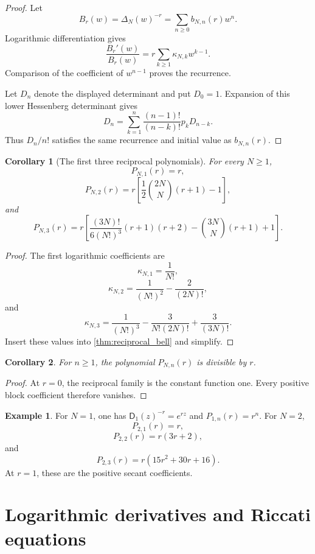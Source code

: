 \documentclass{aomart}
\newtheorem{corollary}[corollary]{Corollary}
\theoremstyle{definition}
\newtheorem{example}[example]{Example}
\theoremstyle{remark}
\newcommand{\Dfun}{\mathsf D}
\begin{document}
\begin{proof}
Let
\[
B_r(w)=\Delta_N(w)^{-r}
=
\sum_{n\geq0}b_{N,n}(r)w^n.
\]
Logarithmic differentiation gives
\[
\frac{B_r'(w)}{B_r(w)}
=
r\sum_{k\geq1}\kappa_{N,k}w^{k-1}.
\]
Comparison of the coefficient of $w^{n-1}$ proves the recurrence.

Let $D_n$ denote the displayed determinant and put $D_0=1$.  Expansion of this lower Hessenberg determinant gives
\[
D_n
=
\sum_{k=1}^{n}
\frac{(n-1)!}{(n-k)!}p_kD_{n-k}.
\]
Thus $D_n/n!$ satisfies the same recurrence and initial value as $b_{N,n}(r)$.
\end{proof}

\begin{corollary}[The first three reciprocal polynomials]\label{cor:first_reciprocal_polynomials}
For every $N\geq1$,
\[
P_{N,1}(r)=r,
\]
\[
P_{N,2}(r)
=
r\left[
\frac12\binom{2N}{N}(r+1)-1
\right],
\]
and
\[
P_{N,3}(r)
=
r\left[
\frac{(3N)!}{6(N!)^3}(r+1)(r+2)
-
\binom{3N}{N}(r+1)
+1
\right].
\]
\end{corollary}

\begin{proof}
The first logarithmic coefficients are
\[
\kappa_{N,1}=\frac1{N!},
\]
\[
\kappa_{N,2}=\frac1{(N!)^2}-\frac2{(2N)!},
\]
and
\[
\kappa_{N,3}
=
\frac1{(N!)^3}
-
\frac3{N!(2N)!}
+
\frac3{(3N)!}.
\]
Insert these values into \cref{thm:reciprocal_bell} and simplify.
\end{proof}

\begin{corollary}\label{cor:factor_r}
For $n\geq1$, the polynomial $P_{N,n}(r)$ is divisible by $r$.
\end{corollary}

\begin{proof}
At $r=0$, the reciprocal family is the constant function one.  Every positive block coefficient therefore vanishes.
\end{proof}

\begin{example}\label{ex:reciprocal_polynomials}
For $N=1$, one has $\Dfun_1(z)^{-r}=e^{rz}$ and $P_{1,n}(r)=r^n$.  For $N=2$,
\[
P_{2,1}(r)=r,
\]
\[
P_{2,2}(r)=r(3r+2),
\]
and
\[
P_{2,3}(r)=r(15r^2+30r+16).
\]
At $r=1$, these are the positive secant coefficients.
\end{example}

\section{Logarithmic derivatives and Riccati equations}\label{sec:tangent}
\end{document}
